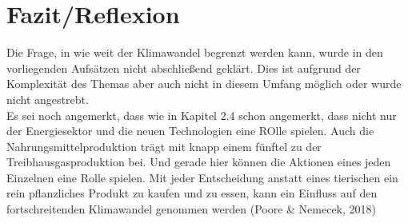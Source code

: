 \chapter{Fazit/Reflexion}
Die Frage, in wie weit der Klimawandel begrenzt werden kann, wurde in den vorliegenden Aufsätzen nicht abschließend geklärt. Dies ist aufgrund der Komplexität des Themas aber auch nicht in diesem Umfang möglich oder wurde nicht angestrebt.\\
Es sei noch angemerkt, dass wie in Kapitel 2.4 schon angemerkt, dass nicht nur der Energiesektor und die neuen Technologien eine ROlle spielen. Auch die Nahrungsmittelproduktion trägt mit knapp einem fünftel zu der Treibhausgasproduktion bei. Und gerade hier können die Aktionen eines jeden Einzelnen eine Rolle spielen. Mit jeder Entscheidung anstatt eines tierischen ein rein pflanzliches Produkt zu kaufen und zu essen, kann ein Einfluss auf den fortschreitenden Klimawandel genommen werden (Poore & Nemecek, 2018)\\
